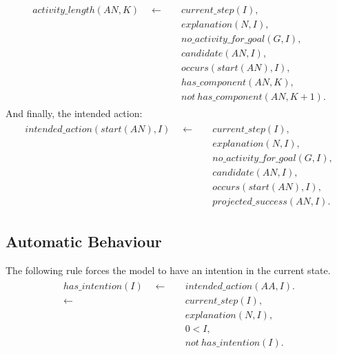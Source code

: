 \documentclass[11pt, oneside]{article}
\begin{document}
\begin{align}\begin{split}
activity\_length(AN,K) \quad \leftarrow \quad &current\_step(I),\\
&explanation(N,I),\\
&no\_activity\_for\_goal(G,I),\\
&candidate(AN,I),\\
&occurs(start(AN),I),\\
&has\_component(AN,K),\\
&not\ has\_component(AN,K+1).
\end{split}\end{align}
And finally, the intended action:
\begin{align}\begin{split}
intended\_action(start(AN),I)\quad \leftarrow \quad &current\_step(I),\\
&explanation(N,I),\\
&no\_activity\_for\_goal(G,I),\\
&candidate(AN,I),\\
&occurs(start(AN),I),\\
&projected\_success(AN,I).
\end{split}\end{align}

\subsection{Automatic Behaviour}
The following rule  forces the model to have an intention in the current state.
\begin{align}\begin{split}
has\_intention(I)\quad \leftarrow \quad &intended\_action(AA,I).\\
\leftarrow \quad &current\_step(I),\\ &explanation(N,I),\\&0<I,\\ &not\ has\_intention(I).
\end{split}\end{align}


 
 

%
%
 
 
 
\end{document}
